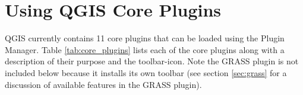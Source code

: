 \section{Using QGIS Core Plugins}\label{sec:core_plugins}

\updatedisclaimer

QGIS currently contains 11 core plugins that can be loaded using the Plugin 
Manager. Table \ref{tab:core_plugins} lists each of the core plugins along 
with a description of their purpose and the toolbar-icon.
Note the GRASS plugin is not included below because it installs its own 
toolbar (see section \ref{sec:grass} for a discussion of available features 
in the GRASS plugin).

